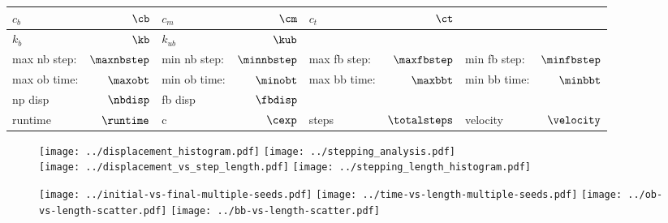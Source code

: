 \documentclass[]{article}
\begin{document}
\begin{table}[tbhp]
  \centering
  \begin{tabular}{|lr|lr|lr|lr|}
    \toprule
    $c_b$ & $\cb$ &
    $c_m$ & $\cm$ &
    $c_t$ & $\ct$ & &\\
    \midrule
    $k_b$ & $\kb$ &
    $k_{ub}$ & $\kub$ & & & &\\
    \midrule
    max nb step: & $\maxnbstep$ &
    min nb step: & $\minnbstep$ &
    max fb step: & $\maxfbstep$ &
    min fb step: & $\minfbstep$\\
    \midrule
    max ob time: & $\maxobt$ &
    min ob time: & $\minobt$ &
    max bb time: & $\maxbbt$ &
    min bb time: & $\minbbt$\\
    \midrule
    np disp & $\nbdisp$ &
    fb disp & $\fbdisp$ & & & &\\
    \midrule
    runtime & $\runtime$ &
    c & $\cexp$ &
    steps & $\totalsteps$ &
    velocity & $\velocity$\\
    \midrule
  \end{tabular}
\end{table}

\begin{figure}[tbhp]
  \centering
  \texttt{[image: ../displacement\_histogram.pdf]}%
  \texttt{[image: ../stepping\_analysis.pdf]}\\
  \texttt{[image: ../displacement\_vs\_step\_length.pdf]}%
  \texttt{[image: ../stepping\_length\_histogram.pdf]}
\end{figure}

\begin{figure}[tbhp]
  \texttt{[image: ../initial-vs-final-multiple-seeds.pdf]}%
  \texttt{[image: ../time-vs-length-multiple-seeds.pdf]}
  \texttt{[image: ../ob-vs-length-scatter.pdf]}%
  \texttt{[image: ../bb-vs-length-scatter.pdf]}
\end{figure}
\end{document}
